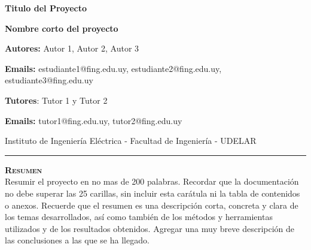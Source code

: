 \documentclass[a4paper,12pt]{article}
\begin{document}
 

\thispagestyle{firstpage}

\begin{linenumbers} %




\vspace{0.5in}
\begin{tcolorbox}
\vspace{2pc}
\centerline{\sc \large \textbf {Titulo del Proyecto}}
\vspace{1pc}
\centerline{\sc \large \textbf {Nombre corto del proyecto}}
\vspace{1pc}
\centerline{\sc \textbf {Autores:} Autor 1, Autor 2, Autor 3 }
\vspace{2pc}
\centerline{\textbf {Emails:} estudiante1@fing.edu.uy, estudiante2@fing.edu.uy, estudiante3@fing.edu.uy}
\vspace{2pc}
\end{tcolorbox}
\centerline{\textbf {Tutores}: Tutor 1 y Tutor 2}
\vspace{1pc}
\centerline{\textbf {Emails:} tutor1@fing.edu.uy, tutor2@fing.edu.uy}
\vspace{2pc}
\centerline{Instituto de Ingenier\'ia El\'ectrica - Facultad de Ingenier\'ia - UDELAR}
\vspace{2pc} 
\noindent\rule{17cm}{0.4pt}
\vspace{2pc}




\begin{tcolorbox}
\textsc{\textbf{Resumen}}\\
\newline
Resumir el proyecto en no mas de 200 palabras. Recordar que la documentaci\'on no debe superar las 25 carillas, sin incluir esta car\'atula ni la 
tabla de contenidos o anexos. Recuerde que el resumen es una descripci\'on corta, concreta y clara de los temas desarrollados, as\'i como tambi\'en de los m\'etodos y herramientas utilizados y de los resultados obtenidos. Agregar una muy breve descripci\'on de las conclusiones a las que se ha llegado.
\end{tcolorbox}


\end{linenumbers}
\end{document}
